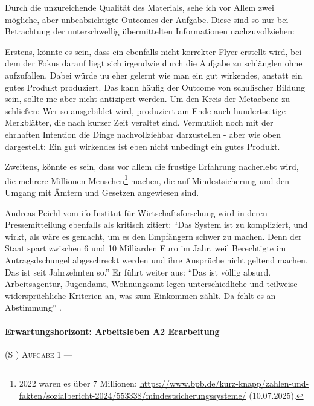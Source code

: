 Durch die unzureichende Qualität des Materials, sehe ich vor Allem zwei mögliche, aber unbeabsichtigte Outcomes der Aufgabe. Diese sind so nur bei Betrachtung der unterschwellig übermittelten Informationen nachzuvollziehen:

Erstens, könnte es sein, dass ein ebenfalls nicht korrekter Flyer erstellt wird, bei dem der Fokus darauf liegt sich irgendwie durch die Aufgabe zu schlänglen ohne aufzufallen. Dabei würde \gls{uu} eher gelernt wie man ein gut wirkendes, anstatt ein gutes Produkt produziert. Das kann häufig der Outcome von schulischer Bildung sein, sollte \gls{me} aber nicht antizipert werden. Um den Kreis der Metaebene zu schließen: Wer so ausgebildet wird, produziert am Ende auch hundertseitige Merkblätter, die nach kurzer Zeit veraltet sind. Vermutlich noch mit der ehrhaften Intention die Dinge nachvollziehbar darzustellen - aber wie oben dargestellt: Ein gut wirkendes ist eben nicht unbedingt ein gutes Produkt. 

Zweitens, könnte es sein, dass vor allem die frustige Erfahrung nacherlebt wird, die mehrere Millionen Menschen\footnote{
    2022 waren es über 7 Millionen: \url{https://www.bpb.de/kurz-knapp/zahlen-und-fakten/sozialbericht-2024/553338/mindestsicherungssysteme/} (10.07.2025). %
    } 
machen, die auf Mindestsicherung und den Umgang mit Ämtern und Gesetzen angewiesen sind. 

Andreas Peichl vom ifo Institut für Wirtschaftsforschung wird in deren Pressemitteilung ebenfalls als kritisch zitiert: \enquote{Das System ist zu kompliziert, und wirkt, als wäre es gemacht, um es den Empfängern schwer zu machen. Denn der Staat spart zwischen 6 und 10 Milliarden Euro im Jahr, weil Berechtigte im Antragsdschungel abgeschreckt werden und ihre Ansprüche nicht geltend machen. Das ist seit Jahrzehnten so.} Er führt weiter aus: \enquote{Das ist völlig absurd. Arbeitsagentur, Jugendamt, Wohnungsamt legen unterschiedliche und teilweise widersprüchliche Kriterien an, was zum Einkommen zählt. Da fehlt es an Abstimmung} \autocite{ifo.05.05.2021}.





\paragraph{Erwartungshorizont: Arbeitsleben A2 Erarbeitung} (\gls{S} \pageref{ARBEITSLEBEN-A2})
\textsc{Aufgabe 1} \quad 
--- 

